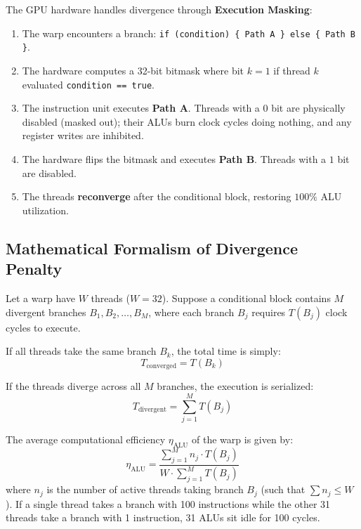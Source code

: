 \documentclass[a4paper,11pt]{article}
\begin{document}
The GPU hardware handles divergence through \textbf{Execution Masking}:
\begin{enumerate}
  \item The warp encounters a branch: \texttt{if (condition) \{ Path A \} else \{ Path B \}}.
  \item The hardware computes a 32-bit bitmask where bit $k = 1$ if thread $k$ evaluated \texttt{condition == true}.
  \item The instruction unit executes \textbf{Path A}. Threads with a $0$ bit are physically disabled (masked out); their ALUs burn clock cycles doing nothing, and any register writes are inhibited.
  \item The hardware flips the bitmask and executes \textbf{Path B}. Threads with a $1$ bit are disabled.
  \item The threads \textbf{reconverge} after the conditional block, restoring $100\%$ ALU utilization.
\end{enumerate}

\subsection{Mathematical Formalism of Divergence Penalty}

Let a warp have $W$ threads ($W = 32$). Suppose a conditional block contains $M$ divergent branches $B_1, B_2, \dots, B_M$, where each branch $B_j$ requires $T(B_j)$ clock cycles to execute.

If all threads take the same branch $B_k$, the total time is simply:
\begin{equation}
  T_{\text{converged}} = T(B_k)
\end{equation}

If the threads diverge across all $M$ branches, the execution is serialized:
\begin{equation}
  T_{\text{divergent}} = \sum_{j=1}^{M} T(B_j)
\end{equation}

The average computational efficiency $\eta_{\text{ALU}}$ of the warp is given by:
\begin{equation}
  \eta_{\text{ALU}} = \frac{\sum_{j=1}^{M} n_j \cdot T(B_j)}{W \cdot \sum_{j=1}^{M} T(B_j)}
\end{equation}
where $n_j$ is the number of active threads taking branch $B_j$ (such that $\sum n_j \le W$). If a single thread takes a branch with 100 instructions while the other 31 threads take a branch with 1 instruction, 31 ALUs sit idle for 100 cycles.
\end{document}
